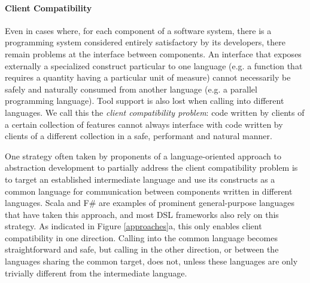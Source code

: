 \paragraph{Client Compatibility} Even in cases where, for each component of a software system, there is a programming system considered entirely satisfactory by its developers, there remain problems at the interface between components. An interface that exposes externally a specialized construct particular to one language (e.g. a function that requires a quantity having a particular unit of measure) cannot necessarily be safely and naturally consumed from another language (e.g. a parallel programming language). Tool support is also lost when calling into different languages. We call this the \emph{client compatibility problem}: code written by clients of a certain collection of features cannot always interface with code written by clients of a different collection  in a safe, performant and natural manner.

One strategy often taken by proponents of a {language-oriented approach} to abstraction development \cite{journals/stp/Ward94} to partially address the client compatibility problem is to  target an established intermediate language and use its constructs as a common language for communication between components written in different languages. Scala \cite{200464/IC} and F\# \cite{pickering2007foundations} are examples of prominent general-purpose languages that have taken this approach, and most DSL frameworks also rely on this strategy. As indicated in Figure \ref{approaches}a, this only enables client compatibility in one direction. Calling into the common language becomes straightforward and safe, but calling in the other direction, or between the languages sharing the common target, does not, unless these languages are only trivially different from the intermediate language. 

